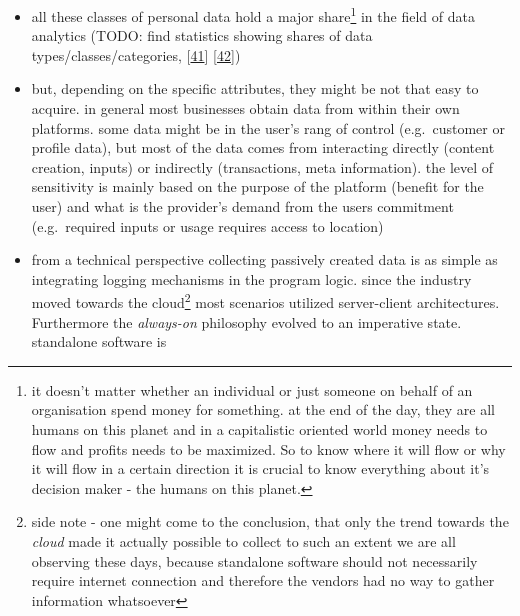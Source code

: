 \documentclass[12pt,english,a4paper,titlepage,cleardoublepage=empty,dottedtoc]{report}
\begin{document}
\begin{itemize}
  changes, or web search history and goes all the way up to health data
  and self-created content like \emph{Tweets}\footnote{public massages
    published by an account on \url{twitter.com}, which will be
    displayed in the timeline of all her subscribers and also might
    contain additional types of content like images, links or video} or
  videos.
\item
  all these classes of personal data hold a major share\footnote{it
    doesn't matter whether an individual or just someone on behalf of an
    organisation spend money for something. at the end of the day, they
    are all humans on this planet and in a capitalistic oriented world
    money needs to flow and profits needs to be maximized. So to know
    where it will flow or why it will flow in a certain direction it is
    crucial to know everything about it's decision maker - the humans on
    this planet.} in the field of data analytics (TODO: find statistics
  showing shares of data types/classes/categories,
  {[}\protect\hyperlink{ref-book-chapter_1999_Principles-of-knowledge-discovery-in-databases_introduction-to-data-mining}{41}{]}
  {[}\protect\hyperlink{ref-web_2013_big-data-collection-collides-with-privacy-concerns}{42}{]})
\item
  but, depending on the specific attributes, they might be not that easy
  to acquire. in general most businesses obtain data from within their
  own platforms. some data might be in the user's rang of control
  (e.g.~customer or profile data), but most of the data comes from
  interacting directly (content creation, inputs) or indirectly
  (transactions, meta information). the level of sensitivity is mainly
  based on the purpose of the platform (benefit for the user) and what
  is the provider's demand from the users commitment (e.g.~required
  inputs or usage requires access to location)
\item
  from a technical perspective collecting passively created data is as
  simple as integrating logging mechanisms in the program logic. since
  the industry moved towards the cloud\footnote{side note - one might
    come to the conclusion, that only the trend towards the \emph{cloud}
    made it actually possible to collect to such an extent we are all
    observing these days, because standalone software should not
    necessarily require internet connection and therefore the vendors
    had no way to gather information whatsoever} most scenarios utilized
  server-client architectures. Furthermore the \emph{always-on}
  philosophy evolved to an imperative state. standalone software is

\end{itemize}
\end{document}
